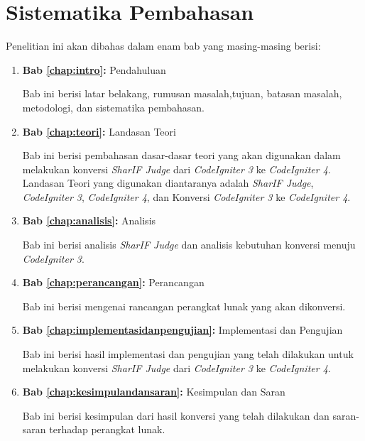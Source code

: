 \section{Sistematika Pembahasan}
\label{sec:sispem}
Penelitian ini akan dibahas dalam enam bab yang masing-masing berisi:
\begin{enumerate}
	\item \textbf{Bab \ref{chap:intro}:} Pendahuluan
	
	Bab ini berisi latar belakang, rumusan masalah,tujuan, batasan masalah, metodologi, dan sistematika pembahasan.
	\item \textbf{Bab \ref{chap:teori}:} Landasan Teori
	
	Bab ini berisi pembahasan dasar-dasar teori yang akan digunakan dalam melakukan konversi \textit{SharIF Judge} dari \textit{CodeIgniter 3} ke \textit{CodeIgniter 4}. Landasan Teori yang digunakan diantaranya adalah \textit{SharIF Judge}, \textit{CodeIgniter 3}, \textit{CodeIgniter 4}, dan Konversi \textit{CodeIgniter 3} ke \textit{CodeIgniter 4}.
	\item \textbf{Bab \ref{chap:analisis}:} Analisis
	
	Bab ini berisi analisis \textit{SharIF Judge} dan analisis kebutuhan konversi menuju \textit{CodeIgniter 3}.
	\item \textbf{Bab \ref{chap:perancangan}:} Perancangan
	
	Bab ini berisi mengenai rancangan perangkat lunak yang akan dikonversi.
	\item \textbf{Bab \ref{chap:implementasidanpengujian}:} Implementasi dan Pengujian
	
	Bab ini berisi hasil implementasi dan pengujian yang telah dilakukan untuk melakukan konversi \textit{SharIF Judge} dari \textit{CodeIgniter 3} ke \textit{CodeIgniter 4}.
	\item \textbf{Bab \ref{chap:kesimpulandansaran}:} Kesimpulan dan Saran
	
	Bab ini berisi kesimpulan dari hasil konversi yang telah dilakukan dan saran-saran terhadap perangkat lunak.
\end{enumerate}
